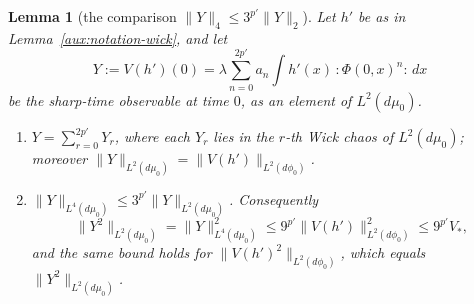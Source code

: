 \documentclass[11pt,a4paper]{article}
\theoremstyle{plain}
\theoremstyle{definition}
\theoremstyle{plain}
\newtheorem{auxlemma}{Lemma}
\theoremstyle{definition}
\newcommand{\dmu}{d\mu_0}
\newcommand{\dphi}{d\phi_0}
\begin{document}
\begin{auxlemma}[the comparison $\|Y\|_4\le3^{p'}\|Y\|_2$]\label{aux:notation-hyper}
Let $h'$ be as in Lemma~\ref{aux:notation-wick}, and let
\[
 Y:=V(h')(0)=\lambda\sum_{n=0}^{2p'}a_n\int h'(x)\,{:}\Phi(0,x)^n{:}\,dx
\]
be the sharp-time observable at time $0$, as an element of $L^2(\dmu)$.
\begin{enumerate}
\item[\textup{(i)}] $Y=\sum_{r=0}^{2p'}Y_r$, where each $Y_r$ lies in the $r$-th Wick chaos
of $L^2(\dmu)$; moreover $\|Y\|_{L^2(\dmu)}=\|V(h')\|_{L^2(\dphi)}$.
\item[\textup{(ii)}] $\|Y\|_{L^4(\dmu)}\le3^{p'}\|Y\|_{L^2(\dmu)}$.  Consequently
\[
 \|Y^2\|_{L^2(\dmu)}=\|Y\|_{L^4(\dmu)}^2\le9^{p'}\|V(h')\|_{L^2(\dphi)}^2\le9^{p'}V_* ,
\]
and the same bound holds for $\|V(h')^2\|_{L^2(\dphi)}$, which equals $\|Y^2\|_{L^2(\dmu)}$.
\end{enumerate}
\end{auxlemma}
\end{document}
